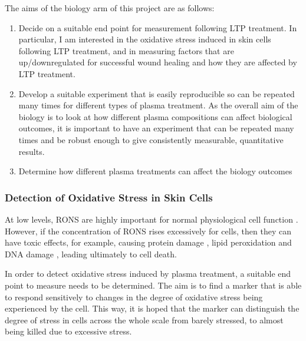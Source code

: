 \documentclass[11pt, oneside]{article}   	%
\begin{document}
The aims of the biology arm of this project are as follows:
\begin{enumerate}
\item Decide on a suitable end point for measurement following LTP treatment. In particular, I am interested in the oxidative stress induced in skin cells following LTP treatment, and in measuring factors that are up/downregulated for successful wound healing and how they are affected by LTP treatment.
\item Develop a suitable experiment that is easily reproducible so can be repeated many times for different types of plasma treatment. As the overall aim of the biology is to look at how different plasma compositions can affect biological outcomes, it is important to have an experiment that can be repeated many times and be robust enough to give consistently measurable, quantitative results.
\item Determine how different plasma treatments can affect the biology outcomes
\end{enumerate}



\subsubsection{Detection of Oxidative Stress in Skin Cells}

At low levels, RONS are highly important for normal physiological cell function \cite{Fang2004antimicrobial, Thannickal2000reactive}.
However, if the concentration of RONS rises excessively for cells, then they can have toxic effects, for example, causing protein damage \cite{PhamHuy2008free}, lipid peroxidation \cite{Ayala2014lipid} and DNA damage \cite{Dizdaroglu2012oxidatively}, leading ultimately to cell death.

In order to detect oxidative stress induced by plasma treatment, a suitable end point to measure needs to be determined.
The aim is to find a marker that is able to respond sensitively to changes in the degree of oxidative stress being experienced by the cell.
This way, it is hoped that the marker can distinguish the degree of stress in cells across the whole scale from barely stressed, to almost being killed due to excessive stress.
\end{document}
